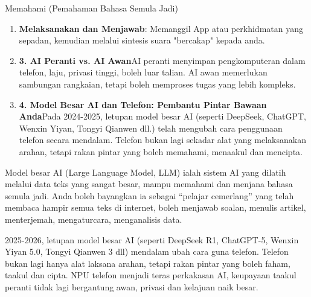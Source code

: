 


Memahami (Pemahaman Bahasa Semula Jadi)


\begin{enumerate}
  \item \textbf{Melaksanakan dan Menjawab}: Memanggil App atau perkhidmatan yang sepadan, kemudian melalui sintesis suara "bercakap" kepada anda.
  \item \textbf{3. AI Peranti vs. AI Awan}AI peranti menyimpan pengkomputeran dalam telefon, laju, privasi tinggi, boleh luar talian. AI awan memerlukan sambungan rangkaian, tetapi boleh memproses tugas yang lebih kompleks.
  \item \textbf{4. Model Besar AI dan Telefon: Pembantu Pintar Bawaan Anda}Pada 2024-2025, letupan model besar AI (seperti DeepSeek, ChatGPT, Wenxin Yiyan, Tongyi Qianwen dll.) telah mengubah cara penggunaan telefon secara mendalam. Telefon bukan lagi sekadar alat yang melaksanakan arahan, tetapi rakan pintar yang boleh memahami, menaakul dan mencipta.
\end{enumerate}


Model besar AI (Large Language Model, LLM) ialah sistem AI yang dilatih melalui data teks yang sangat besar, mampu memahami dan menjana bahasa semula jadi. Anda boleh bayangkan ia sebagai “pelajar cemerlang” yang telah membaca hampir semua teks di internet, boleh menjawab soalan, menulis artikel, menterjemah, mengaturcara, menganalisis data.


2025-2026, letupan model besar AI (seperti DeepSeek R1, ChatGPT-5, Wenxin Yiyan 5.0, Tongyi Qianwen 3 dll) mendalam ubah cara guna telefon. Telefon bukan lagi hanya alat laksana arahan, tetapi rakan pintar yang boleh faham, taakul dan cipta. NPU telefon menjadi teras perkakasan AI, keupayaan taakul peranti tidak lagi bergantung awan, privasi dan kelajuan naik besar.


